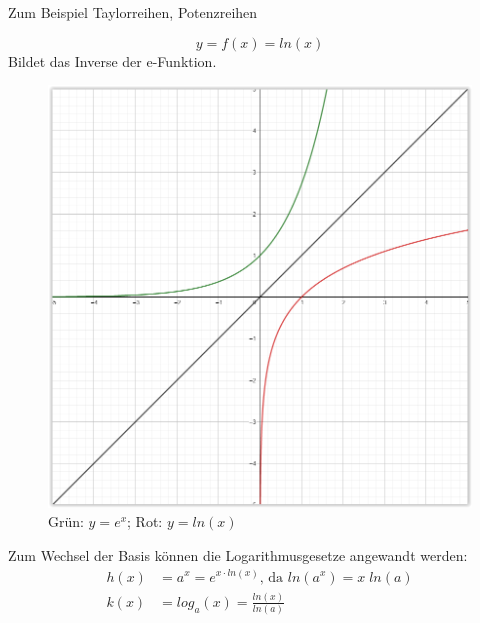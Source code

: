 		Zum Beispiel Taylorreihen, Potenzreihen
		
		\begin{equation}
		  y = f(x) = ln(x)
		\end{equation}
		Bildet das Inverse der e-Funktion. 
		\begin{figure}[H]
		  \centering
		  \includegraphics[width=0.35\linewidth]{./img/funktionen_e_ln.png}
		  \caption{Grün: $y = e^x$; Rot: $y = ln(x)$}
		  \label{fig:funkt_e_ln}
		\end{figure}
		Zum Wechsel der Basis können die Logarithmusgesetze angewandt werden:
		\begin{align}
		  h(x) &= a^x = e^{x \cdot ln(x)} \text{, da } ln(a^x) = x\;ln(a) \nonumber \\
		  k(x) &= log_a(x) = \frac{ln(x)}{ln(a)}
		\end{align}
		

